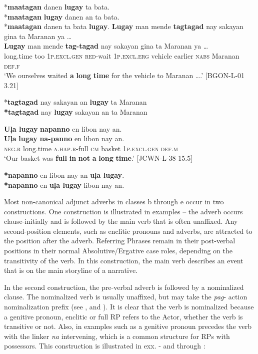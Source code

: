 *\textbf{maatagan} danen \textbf{lugay} ta bata. \\
*\textbf{maatagan} \textbf{lugay} danen an ta bata. \\
*\textbf{maatagan} danen ta bata \textbf{lugay}.
\z
\ea
\textbf{Lugay}  man  mende  \textbf{tagtagad}  nay  sakayan  gina ta  Maranan  ya … \\\smallskip
 \gll \textbf{Lugay}  man  mende  \textbf{tag-tagad}  nay  sakayan  gina ta  Maranan  ya … \\
long.time  too  1\textsc{p.excl.gen}  \textsc{red}-wait  1\textsc{p.excl.erg}  vehicle  earlier
\textsc{nabs}  Maranan  \textsc{def.f} \\
\glt ‘We ourselves waited \textbf{a} \textbf{long} \textbf{time} for the vehicle to Maranan ….’ [BGON-L-01 3.21] \\\smallskip

*\textbf{tagtagad} nay sakayan an \textbf{lugay} ta Maranan \\
\textbf{*tagtagad} nay \textbf{lugay} sakayan an ta Maranan
\z

\ea
\textbf{Uļa  lugay}  \textbf{napanno}  en  libon  nay  an. \\\smallskip
 \gll \textbf{Uļa}  \textbf{lugay}  \textbf{na-panno}  en  libon  nay  an. \\
\textsc{neg.r}  long.time  \textsc{a.hap.r}-full  \textsc{cm}  basket  1\textsc{p.excl.gen}  \textsc{def.m} \\
\glt ‘Our basket was \textbf{full} \textbf{in} \textbf{not} \textbf{a} \textbf{long} \textbf{time}.’ [JCWN-L-38 15.5] \\\smallskip

\textbf{*napanno} en libon nay an \textbf{uļa lugay}. \\
\textbf{*napanno} en \textbf{uļa lugay} libon nay an.
\z

Most non-canonical adjunct adverbs in classes b through e occur in two constructions. One construction is illustrated in examples -- the adverb occurs clause-initially and is followed by the main verb that is often unaffixed. Any second-position elements, such as enclitic pronouns and adverbs, are attracted to the position after the adverb. Referring Phrases remain in their post-verbal positions in their normal Absolutive/Ergative case roles, depending on the transitivity of the verb. In this construction, the main verb describes an event that is on the main storyline of a narrative.

In the second construction, the pre-verbal adverb is followed by a nominalized clause. The nominalized verb is usually unaffixed, but may take the \textit{pag}{}- action nominalization prefix (see ,  and ). It is clear that the verb is nominalized because a genitive pronoun, enclitic or full RP refers to the Actor, whether the verb is transitive or not. Also, in examples such as  a genitive pronoun precedes the verb with the linker \textit{na} intervening, which is a common structure for RPs with possessors. This construction is illustrated in exx. - and  through :

